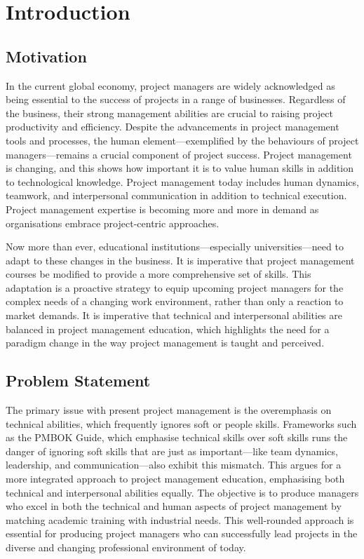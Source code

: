 \documentclass{article}
\begin{document}
\section{Introduction}
\subsection{Motivation}
In the current global economy, project managers are widely acknowledged as being essential to the success of projects in a range of businesses. Regardless of the business, their strong management abilities are crucial to raising project productivity and efficiency. Despite the advancements in project management tools and processes, the human element—exemplified by the behaviours of project managers—remains a crucial component of project success. Project management is changing, and this shows how important it is to value human skills in addition to technological knowledge. Project management today includes human dynamics, teamwork, and interpersonal communication in addition to technical execution. Project management expertise is becoming more and more in demand as organisations embrace project-centric approaches. \cite{pant2008project}

Now more than ever, educational institutions—especially universities—need to adapt to these changes in the business. It is imperative that project management courses be modified to provide a more comprehensive set of skills. This adaptation is a proactive strategy to equip upcoming project managers for the complex needs of a changing work environment, rather than only a reaction to market demands. It is imperative that technical and interpersonal abilities are balanced in project management education, which highlights the need for a paradigm change in the way project management is taught and perceived.

\subsection{Problem Statement}
The primary issue with present project management is the overemphasis on technical abilities, which frequently ignores soft or people skills. Frameworks such as the PMBOK Guide, which emphasise technical skills over soft skills runs the danger of ignoring soft skills that are just as important—like team dynamics, leadership, and communication—also exhibit this mismatch. This argues for a more integrated approach to project management education, emphasising both technical and interpersonal abilities equally. The objective is to produce managers who excel in both the technical and human aspects of project management by matching academic training with industrial needs. This well-rounded approach is essential for producing project managers who can successfully lead projects in the diverse and changing professional environment of today. \cite{pant2008project}
\end{document}
